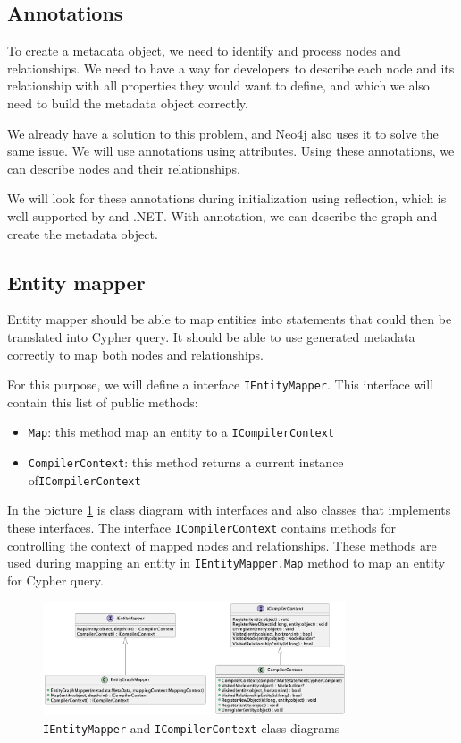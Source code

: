 \subsection {Annotations}

To create a metadata object, we need to identify and process nodes and relationships. We need to have a way for developers to describe each node and its relationship with all properties they would want to define, and which we also need to build the metadata object correctly.

We already have a solution to this problem, and Neo4j also uses it to solve the same issue. We will use annotations using attributes. Using these annotations, we can describe nodes and their relationships.

We will look for these annotations during initialization using reflection, which is well supported by \CS and .NET. With annotation, we can describe the graph and create the metadata object.

\subsection {Entity mapper}

Entity mapper should be able to map entities into statements that could then be translated into Cypher query. It should be able to use generated metadata correctly
to map both nodes and relationships.

For this purpose, we will define a interface \texttt{IEntityMapper}. This interface will contain
this list of public methods:

\begin{itemize}
    \item {\texttt{Map}: this method map an entity to a \texttt{ICompilerContext}}
    \item {\texttt{CompilerContext}: this method returns a current instance of\linebreak\texttt{ICompilerContext}}
\end{itemize}

In the picture \ref{fig:IEntityMapperClassDiagram} is class diagram with interfaces and also classes that implements these interfaces.
The interface \texttt{ICompilerContext} contains methods for controlling the context of mapped nodes and relationships. These methods
are used during mapping an entity in \texttt{IEntityMapper.Map} method to map an entity for Cypher query.

\begin{figure}[H]
    \centering
    \includegraphics[width=0.8\textwidth]{content/entitymapper.png}
    \caption{\texttt{IEntityMapper} and \texttt{ICompilerContext} class diagrams}
    \label{fig:IEntityMapperClassDiagram}
\end{figure}

